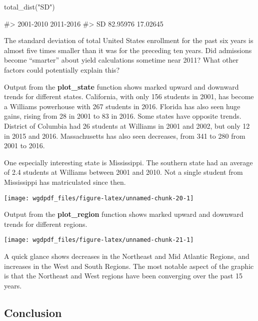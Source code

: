 \begin{Schunk}
\begin{Sinput}
total_dist("SD")
\end{Sinput}
\begin{Soutput}
#>    2001-2010 2011-2016
#> SD  82.95976  17.02645
\end{Soutput}
\end{Schunk}

The standard deviation of total United States enrollment for the past
six years is almost five times smaller than it was for the preceding ten
years. Did admissions become ``smarter'' about yield calculations
sometime near 2011? What other factors could potentially explain this?

Output from the \textbf{plot\_state} function shows marked upward and
downward trends for different states. California, with only 156 students
in 2001, has become a Williams powerhouse with 267 students in 2016.
Florida has also seen huge gains, rising from 28 in 2001 to 83 in 2016.
Some states have opposite trends. District of Columbia had 26 students
at Williams in 2001 and 2002, but only 12 in 2015 and 2016.
Massachusetts has also seen decreases, from 341 to 280 from 2001 to
2016.

One especially interesting state is Mississippi. The southern state had
an average of 2.4 students at Williams between 2001 and 2010. Not a
single student from Mississippi has matriculated since then.

\begin{Schunk}

\texttt{[image: wgdpdf\_files/figure-latex/unnamed-chunk-20-1]} \end{Schunk}

Output from the \textbf{plot\_region} function shows marked upward and
downward trends for different regions.

\begin{Schunk}

\texttt{[image: wgdpdf\_files/figure-latex/unnamed-chunk-21-1]} \end{Schunk}

A quick glance shows decreases in the Northeast and Mid Atlantic
Regions, and increases in the West and South Regions. The most notable
aspect of the graphic is that the Northeast and West regions have been
converging over the past 15 years.

\subsection{Conclusion}\label{conclusion}

